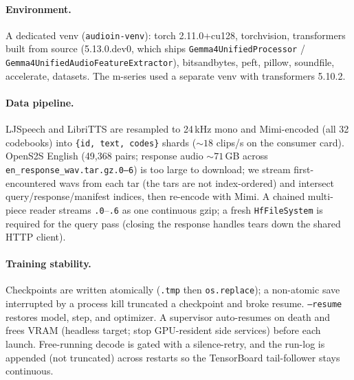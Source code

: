 \documentclass[11pt]{article}
\begin{document}
\paragraph{Environment.} A dedicated venv (\texttt{audioin-venv}): torch
2.11.0+cu128, torchvision, transformers built from source (5.13.0.dev0, which
ships \texttt{Gemma4UnifiedProcessor} / \texttt{Gemma4Unified\allowbreak Audio\allowbreak Feature\allowbreak Extractor}),
bitsandbytes, peft, pillow, soundfile, accelerate, datasets. The m-series used a
separate venv with transformers 5.10.2.

\paragraph{Data pipeline.} LJSpeech and LibriTTS are resampled to 24\,kHz mono and
Mimi-encoded (all 32 codebooks) into \texttt{\{id, text, codes\}} shards
(${\sim}18$ clips/s on the consumer card). OpenS2S English (49{,}368 pairs;
response audio ${\sim}71$\,GB across \texttt{en\_response\_wav.tar.gz.0--6}) is too
large to download; we stream first-encountered wavs from each tar (the tars are
not index-ordered) and intersect query/response/manifest indices, then re-encode
with Mimi. A chained multi-piece reader streams \texttt{.0}--\texttt{.6} as one
continuous gzip; a fresh \texttt{HfFileSystem} is required for the query pass
(closing the response handles tears down the shared HTTP client).

\paragraph{Training stability.} Checkpoints are written atomically
(\texttt{.tmp} then \texttt{os.replace}); a non-atomic save interrupted by a process
kill truncated a checkpoint and broke resume. \texttt{--resume} restores model,
step, and optimizer. A supervisor auto-resumes on death and frees VRAM (headless
target; stop GPU-resident side services) before each launch. Free-running decode
is gated with a silence-retry, and the run-log is appended (not truncated) across
restarts so the TensorBoard tail-follower stays continuous.
\end{document}
